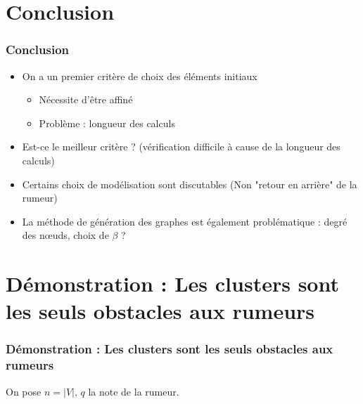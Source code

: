 \documentclass{beamer}
\begin{document}
\section{Conclusion}
\begin{frame}
  \frametitle{Conclusion}
  \begin{itemize}
    \item On a un premier critère de choix des éléments initiaux 
    \begin{itemize}
      \item Nécessite d'être affiné
      \item Problème : longueur des calculs
    \end{itemize}
    \item Est-ce le meilleur critère ? (vérification difficile à cause de la longueur des calculs)
    \item Certains choix de modélisation sont discutables (Non "retour en arrière" de la rumeur)
    \item La méthode de génération des graphes est également problématique : degré des nœuds, choix de $\beta$ ?
  \end{itemize}
\end{frame}

\appendix

\section{Démonstration : Les clusters sont les seuls obstacles aux rumeurs}
\begin{frame}
  \frametitle{Démonstration : Les clusters sont les seuls obstacles aux rumeurs}
  On pose $n=|V|$, $q$ la note de la rumeur.
\end{frame}
\end{document}
